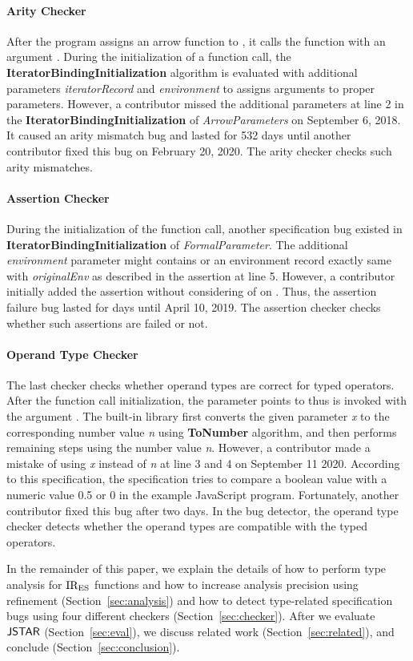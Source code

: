 \paragraph{Arity Checker} After the program assigns an arrow function to
, it calls the function with an argument .  During the
initialization of a function call, the \textbf{IteratorBindingInitialization}
algorithm is evaluated with additional parameters \textit{iteratorRecord} and
\textit{environment} to assigns arguments to proper parameters.  However, a
contributor missed the additional parameters at line 2 in the
\textbf{IteratorBindingInitialization} of \textit{ArrowParameters} on September
6, 2018.  It caused an arity mismatch bug and lasted for 532 days until another
contributor fixed this bug on February 20, 2020.  The arity checker checks such
arity mismatches.

\paragraph{Assertion Checker} During the initialization of the function call,
another specification bug existed in \textbf{IteratorBindingInitialization} of
\textit{FormalParameter}.  The additional \textit{environment} parameter might
contains  or an environment record exactly same with
\textit{originalEnv} as described in the assertion at line 5.  However, a
contributor initially added the assertion without considering of
 on .  Thus, the assertion failure bug
lasted for  days until April 10, 2019.  The assertion checker checks
whether such assertions are failed or not.

\paragraph{Operand Type Checker} The last checker checks whether operand types
are correct for typed operators.  After the function call initialization, the
parameter  points to  thus  is invoked
with the argument .  The  built-in library
first converts the given parameter \textit{x} to the corresponding number value
\textit{n} using \textbf{ToNumber} algorithm, and then performs remaining steps
using the number value \textit{n}.  However, a contributor made a mistake of
using \textit{x} instead of \textit{n} at line 3 and 4 on September 11 2020.
According to this specification, the specification tries to compare a boolean
value  with a numeric value 0.5 or 0 in the example JavaScript
program.  Fortunately, another contributor fixed this bug after two days.  In
the bug detector, the operand type checker detects whether the operand types are
compatible with the typed operators.

In the remainder of this paper, we explain the details of how to perform type
analysis for ${\text{IR}_\text{ES}}$ functions and how to increase analysis precision using
refinement (Section~\ref{sec:analysis}) and how to detect type-related
specification bugs using four different checkers (Section~\ref{sec:checker}).
After we evaluate $\textsf{JSTAR}$ (Section~\ref{sec:eval}), we discuss related work
(Section~\ref{sec:related}), and conclude (Section~\ref{sec:conclusion}).
